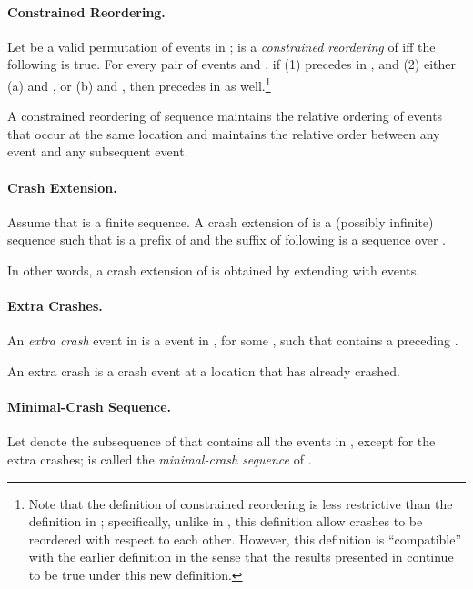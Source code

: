 \documentclass[11pt]{article}
\numberwithin{theorem}{section}
\begin{document}
\paragraph{Constrained Reordering.}
Let  be a valid permutation of events in ;  is a
\emph{constrained reordering} of  iff the following is true. For
every pair of events  and , if (1)  precedes  in , and
(2) either (a)  and , or (b)  and , then  precedes
 in  as well.\footnote{Note that the definition of constrained reordering is less restrictive than the definition in \cite{cornejoetalAFD,cornejoetalAFD-TR}; specifically, unlike in \cite{cornejoetalAFD,cornejoetalAFD-TR}, this definition allow crashes to be reordered with respect to each other. However, this definition is ``compatible'' with the earlier definition in the sense that the results presented in \cite{cornejoetalAFD,cornejoetalAFD-TR} continue to be true under this new definition.}

A constrained reordering of sequence  maintains the relative
ordering of events that occur at the same location and maintains the
relative order between any  event and any subsequent event.

\paragraph{Crash Extension.} Assume that  is a finite sequence. A
crash extension of  is a (possibly infinite) sequence  such
that  is a prefix of  and the suffix of  following  is a
sequence over .

In other words, a crash extension of  is obtained by extending 
with  events.

\paragraph{Extra Crashes.} 
An \emph{extra crash} event in  is a  event in , for
some , such that  contains a preceding . 

An extra crash is a crash event at a location that has already
crashed.

\paragraph{Minimal-Crash Sequence.} 
Let  denote the subsequence of  that contains all the
events in , except for the extra crashes;  is called
the \emph{minimal-crash sequence} of .
\end{document}
